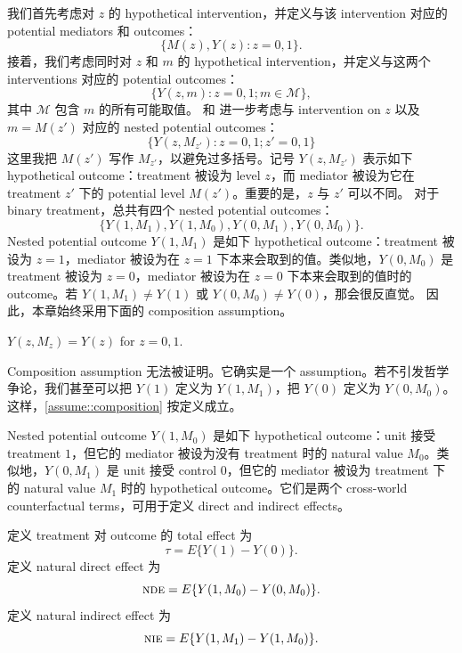  
我们首先考虑对 $z$ 的 hypothetical intervention，并定义与该 intervention 对应的 potential mediators 和 outcomes：
$$
\{ M(z) , Y(z): z=0,1\}.
$$
接着，我们考虑同时对 $z$ 和 $m$ 的 hypothetical intervention，并定义与这两个 interventions 对应的 potential outcomes：
$$
\{ Y(z, m): z=0, 1; m \in \mathcal{M}  \},
$$
其中 $ \mathcal{M} $ 包含 $m$ 的所有可能取值。
\citet{Robins::1992} 和 \citet{Pearl::2001} 进一步考虑与 intervention on $z$ 以及 $m=M(z')$ 对应的 nested potential outcomes：
$$
\{ Y(z, M_{z'}) : z = 0,1; z'=0,1   \}
$$
这里我把 $M(z')$ 写作 $M_{z'}$，以避免过多括号。记号 $Y(z,M_{z'})$ 表示如下 hypothetical outcome：treatment 被设为 level $z$，而 mediator 被设为它在 treatment $z'$ 下的 potential level $M(z')$。重要的是，$z$ 与 $z'$ 可以不同。
对于 binary treatment，总共有四个 nested potential outcomes：
$$
\{ Y( 1, M_1),    Y( 1, M_0),  Y( 0, M_1),  Y( 0, M_0) \}.
$$
Nested potential outcome $Y(1,M_1)$ 是如下 hypothetical outcome：treatment 被设为 $z=1$，mediator 被设为在 $z=1$ 下本来会取到的值。类似地，$Y(0,M_0)$ 是 treatment 被设为 $z=0$，mediator 被设为在 $z=0$ 下本来会取到的值时的 outcome。若 $Y(1,M_1)\neq Y(1)$ 或 $Y(0,M_0)\neq Y(0)$，那会很反直觉。
因此，本章始终采用下面的 composition assumption。

\begin{assumption}
[composition]\label{assume::composition}
$Y(z, M_z) =   Y(z)$ for $z=0,1$. 
\end{assumption}


Composition assumption 无法被证明。它确实是一个 assumption。若不引发哲学争论，我们甚至可以把 $Y(1)$ 定义为 $Y(1,M_1)$，把 $Y(0)$ 定义为 $Y(0,M_0)$。这样，\cref{assume::composition} 按定义成立。



Nested potential outcome $Y(1,M_0)$ 是如下 hypothetical outcome：unit 接受 treatment $1$，但它的 mediator 被设为没有 treatment 时的 natural value $M_0$。类似地，$Y(0,M_1)$ 是 unit 接受 control $0$，但它的 mediator 被设为 treatment 下的 natural value $M_1$ 时的 hypothetical outcome。它们是两个 cross-world counterfactual terms，可用于定义 direct and indirect effects。


\begin{definition}
\label{def::mediation}
定义 treatment 对 outcome 的 total effect 为
$$
\tau = E\{ Y(1)  - Y(0) \}.
$$
定义 natural direct effect 为
$$
\textsc{nde} = E\{  Y(1,M_0) - Y(0, M_0)  \}. 
$$
定义 natural indirect effect 为
$$
\textsc{nie} = E\{  Y(1, M_1) - Y(1, M_0) \} .
$$
\end{definition}


